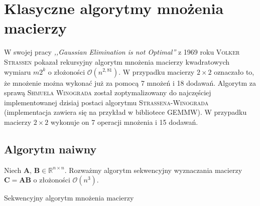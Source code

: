\documentclass[a4paper,oneside,leqno,12pt]{book}
\theoremstyle{definition}
\theoremstyle{plain}
\theoremstyle{remark}
\begin{document}
\chapter{Klasyczne algorytmy mnożenia macierzy}
W swojej pracy \emph{,,Gaussian Elimination is not Optimal''} z 1969 roku \textsc{Volker Strassen} pokazał rekursyjny algorytm mnożenia macierzy kwadratowych wymiaru \(m2^k\) o złożoności \(\mathcal{O}(n^{2,81})\)\cite{Strassen68}. W przypadku macierzy \(2\times 2\) oznaczało to, że mnożenie można wykonać już za pomocą 7 mnożeń i 18 dodawań. Algorytm za sprawą \textsc{Shmuela Winograda} został zoptymalizowany\cite{Winograd}\cite{Loeckx1974} do najczęściej implementowanej dzisiaj postaci algorytmu \textsc{Strassena-Winograda} (implementacja zawiera się na przykład w bibliotece GEMMW\cite{Douglas94gemmw}). W przypadku macierzy \(2\times 2\) wykonuje on 7 operacji mnożenia i 15 dodawań\cite{DBLP:journals/corr/abs-1202-3173}.
\section{Algorytm naiwny}
Niech \(\mathbf{A}\), \(\mathbf{B}\in\mathbb{R}^{n\times n}\). Rozważmy algorytm sekwencyjny wyznaczania macierzy \(\mathbf{C}=\mathbf{AB}\) o złożoności \(\mathcal{O}(n^3)\).

\begin{algorithm}
\caption{Sekwencyjny algorytm mnożenia macierzy}
\end{algorithm}
\newpage
\end{document}
